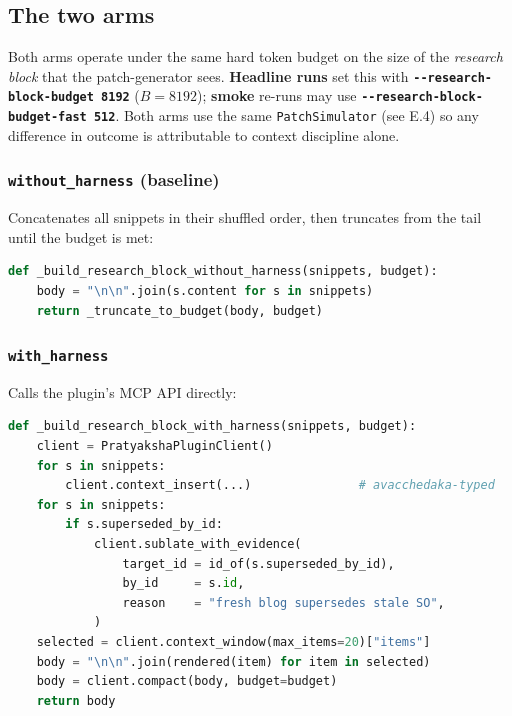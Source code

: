 \subsection{The two arms}\label{the-two-arms}

Both arms operate under the same hard token budget on the size of the \emph{research block} that the patch-generator sees. \textbf{Headline runs} set this with \textbf{\passthrough{\lstinline!--research-block-budget 8192!}} (\(B = 8192\)); \textbf{smoke} re-runs may use \textbf{\passthrough{\lstinline!--research-block-budget-fast 512!}}. Both arms use the same \passthrough{\lstinline!PatchSimulator!} (see E.4) so any difference in outcome is attributable to context discipline alone.

\subsubsection{\texorpdfstring{\texttt{without\_harness} (baseline)}{without\_harness (baseline)}}\label{without_harness-baseline}

Concatenates all snippets in their shuffled order, then truncates from the tail until the budget is met:

\begin{lstlisting}[language=Python]
def _build_research_block_without_harness(snippets, budget):
    body = "\n\n".join(s.content for s in snippets)
    return _truncate_to_budget(body, budget)
\end{lstlisting}

\subsubsection{\texorpdfstring{\texttt{with\_harness}}{with\_harness}}\label{with_harness}

Calls the plugin's MCP API directly:

\begin{lstlisting}[language=Python]
def _build_research_block_with_harness(snippets, budget):
    client = PratyakshaPluginClient()
    for s in snippets:
        client.context_insert(...)               # avacchedaka-typed
    for s in snippets:
        if s.superseded_by_id:
            client.sublate_with_evidence(
                target_id = id_of(s.superseded_by_id),
                by_id     = s.id,
                reason    = "fresh blog supersedes stale SO",
            )
    selected = client.context_window(max_items=20)["items"]
    body = "\n\n".join(rendered(item) for item in selected)
    body = client.compact(body, budget=budget)
    return body
\end{lstlisting}

